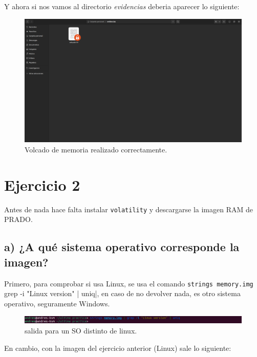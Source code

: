 \documentclass{article}
\begin{document}
Y ahora si nos vamos al directorio \textit{evidencias} deberia aparecer lo siguiente:

\begin{figure}[H]
    \centering
    \includegraphics[width=\textwidth]{imagenes/Captura desde 2022-12-06 11-42-47.png}
    \caption{Volcado de memoria realizado correctamente.}
\end{figure}

\newpage
\section{Ejercicio 2}

Antes de nada hace falta instalar \verb|volatility| y descargarse la imagen RAM de PRADO.

\subsection{a) ¿A qué sistema operativo corresponde la imagen?}

Primero, para comprobar si usa Linux, se usa el comando \verb|strings memory.img | grep -i "Linux version" | uniq|, en caso de no devolver nada, es otro sistema operativo, seguramente Windows.

\begin{figure}[H]
    \centering
    \includegraphics[width=\textwidth]{imagenes/Captura desde 2022-12-06 12-56-51.png}
    \caption{salida para un SO distinto de linux.}
\end{figure}

En cambio, con la imagen del ejercicio anterior (Linux) sale lo siguiente:
\end{document}
